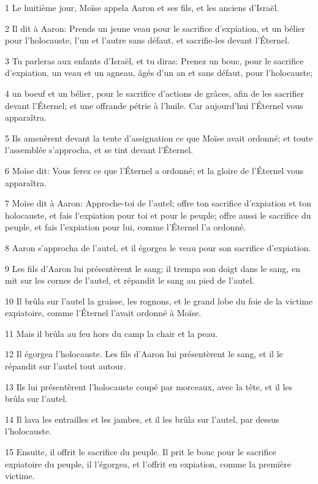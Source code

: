 \par 1 Le huitième jour, Moïse appela Aaron et ses fils, et les anciens d'Israël.
\par 2 Il dit à Aaron: Prends un jeune veau pour le sacrifice d'expiation, et un bélier pour l'holocauste, l'un et l'autre sans défaut, et sacrifie-les devant l'Éternel.
\par 3 Tu parleras aux enfants d'Israël, et tu diras: Prenez un bouc, pour le sacrifice d'expiation, un veau et un agneau, âgés d'un an et sans défaut, pour l'holocauste;
\par 4 un boeuf et un bélier, pour le sacrifice d'actions de grâces, afin de les sacrifier devant l'Éternel; et une offrande pétrie à l'huile. Car aujourd'hui l'Éternel vous apparaîtra.
\par 5 Ils amenèrent devant la tente d'assignation ce que Moïse avait ordonné; et toute l'assemblée s'approcha, et se tint devant l'Éternel.
\par 6 Moïse dit: Vous ferez ce que l'Éternel a ordonné; et la gloire de l'Éternel vous apparaîtra.
\par 7 Moïse dit à Aaron: Approche-toi de l'autel; offre ton sacrifice d'expiation et ton holocauste, et fais l'expiation pour toi et pour le peuple; offre aussi le sacrifice du peuple, et fais l'expiation pour lui, comme l'Éternel l'a ordonné.
\par 8 Aaron s'approcha de l'autel, et il égorgea le veau pour son sacrifice d'expiation.
\par 9 Les fils d'Aaron lui présentèrent le sang; il trempa son doigt dans le sang, en mit sur les cornes de l'autel, et répandit le sang au pied de l'autel.
\par 10 Il brûla sur l'autel la graisse, les rognons, et le grand lobe du foie de la victime expiatoire, comme l'Éternel l'avait ordonné à Moïse.
\par 11 Mais il brûla au feu hors du camp la chair et la peau.
\par 12 Il égorgea l'holocauste. Les fils d'Aaron lui présentèrent le sang, et il le répandit sur l'autel tout autour.
\par 13 Ils lui présentèrent l'holocauste coupé par morceaux, avec la tête, et il les brûla sur l'autel.
\par 14 Il lava les entrailles et les jambes, et il les brûla sur l'autel, par dessus l'holocauste.
\par 15 Ensuite, il offrit le sacrifice du peuple. Il prit le bouc pour le sacrifice expiatoire du peuple, il l'égorgea, et l'offrit en expiation, comme la première victime.

